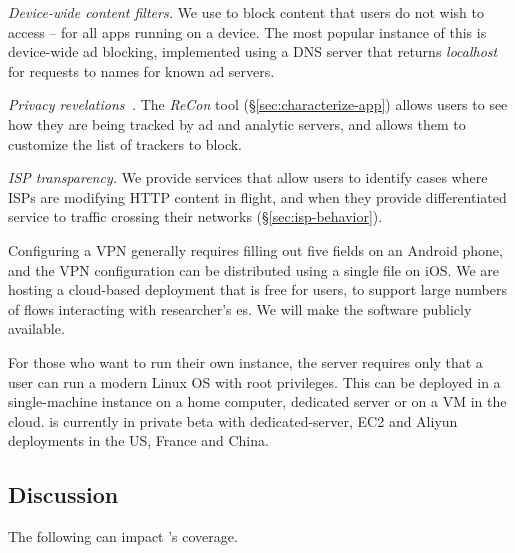 \noindent \emph{Device-wide content filters.} We use \meddle to block content that users do 
not wish to access -- for all apps running on a device. The most popular instance of this is 
device-wide ad blocking, implemented using a DNS server that returns {\em localhost} for 
requests to names for known ad servers.

\noindent \emph{Privacy revelations~\cite{wetherall:revelations}.} The \emph{ReCon} tool (\S\ref{sec:characterize-app}) allows users to see how they are being 
tracked by ad and analytic servers, and allows them to customize the list of trackers to block.

\noindent \emph{ISP transparency.} We provide services that allow users to identify cases where 
ISPs are modifying HTTP content in flight, and when they provide differentiated service to 
traffic crossing their networks (\S\ref{sec:isp-behavior}).


Configuring a VPN generally requires filling out five fields on an Android phone, and the VPN configuration can be distributed using a single file on iOS. 
We are hosting a cloud-based deployment that is free for users, to support large numbers 
of flows interacting with researcher's {\meddlebox}es. We will make 
the \meddle software publicly available.

For those who want to run their own \meddle instance, 
the \meddle server requires only that a user can run a modern Linux OS with root privileges. This can be deployed 
in a single-machine instance on a home computer, dedicated server or on a VM in the cloud. \meddle is currently in 
private beta with dedicated-server, EC2 and Aliyun deployments in the US, France and China. 



\subsection{Discussion}

The following can impact \meddle's coverage.

